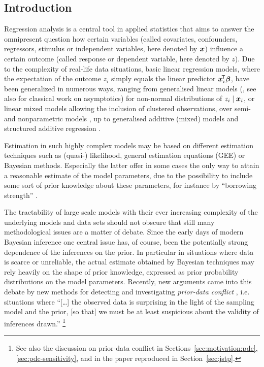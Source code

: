 \subsection{Introduction}
\label{sec:festschrift-intro}

Regression analysis is a central tool in applied statistics that
aims to answer the omnipresent question how certain variables
(called covariates, confounders, regressors, stimulus or
independent variables, here denoted by ${\bm x}$) influence a certain
outcome (called response or dependent variable, here denoted by $z$).
Due to the complexity of real-life data situations, basic linear
regression models, where the expectation of the outcome $z_i$ simply equals the linear predictor ${\bm x}_i^{{\mbox{\!\scriptsize\textsf{T}}}}\boldsymbol{\beta}$,
have been generalized in numerous ways, ranging from generalised linear
models (\cite{2001:fahrmeier-tutz}, see also \cite{1985:fahrmeir-kaufmann} for classical work on asymptotics)
for non-normal distributions of $z_i\mid {\bm x}_i$, or linear mixed models %
allowing the inclusion of clustered observations, over semi- and nonparametric models
\parencite{2009:kauermann,2007:fahrmeir,2007:scheipl}, up to
generalised additive (mixed) models and structured
additive regression \parencite{2009:fahrmeir,2006:fahrmeir,2007:kneib}.

Estimation in such highly complex models may be based on
different estimation techniques such as (quasi-) likelihood, general
estimation equations (GEE) or Bayesian methods. Especially the
latter offer in some cases the only way to attain a reasonable
estimate of the model parameters, due to the possibility to include
some sort of prior knowledge about these parameters, for instance by
``borrowing strength'' \parencite[e.g.,][]{1996:higgins}.

The tractability of large scale models with their ever increasing complexity
of the underlying models and data sets should not obscure that
still many methodological issues are a matter of debate.
Since the early days of modern Bayesian inference one central issue has,
of course, been the potentially strong dependence of the inferences on the prior.
In particular in situations where data is scarce or unreliable, the
actual estimate obtained by Bayesian techniques may rely heavily on
the shape of prior knowledge, expressed as prior probability
distributions on the model parameters. %
Recently, new arguments came into this debate by new methods
for detecting and investigating \emph{prior-data conflict} \parencite{2006:evans,2008:bousquet},
i.e. situations where  ``[\ldots] the observed data is surprising
in the light of the sampling model and the prior,
[so that] we must be at least suspicious about the validity
of inferences drawn.'' \parencite[p.~893]{2006:evans}%
\footnote{See also the discussion on prior-data conflict in
Sections~\ref{sec:motivation:pdc}, \ref{sec:pdc-sensitivity},
and in the paper reproduced in Section~\ref{sec:jstp}.}

